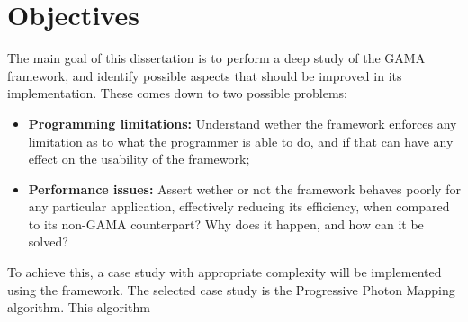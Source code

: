 \section{Objectives}

The main goal of this dissertation is to perform a deep study of the GAMA framework, and identify possible aspects that should be improved in its implementation. These comes down to two possible problems:
\begin{itemize}
  \item \textbf{Programming limitations:} Understand wether the framework enforces any limitation as to what the programmer is able to do, and if that can have any effect on the usability of the framework;
  \item \textbf{Performance issues:} Assert wether or not the framework behaves poorly for any particular application, effectively reducing its efficiency, when compared to its non-GAMA counterpart? Why does it happen, and how can it be solved?
\end{itemize}

To achieve this, a case study with appropriate complexity will be implemented using the framework. The selected case study is the Progressive Photon Mapping algorithm. This algorithm

